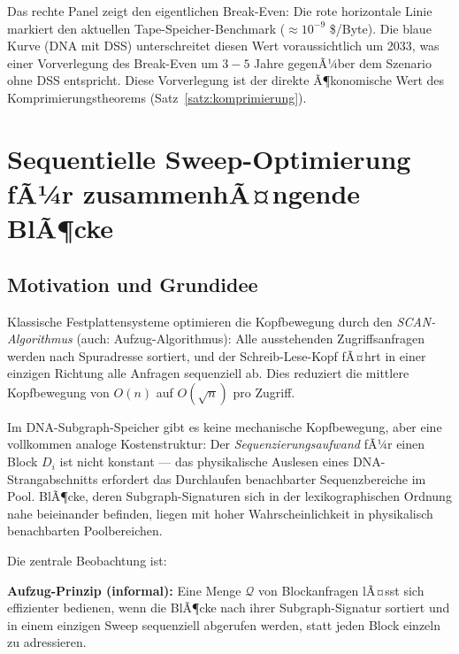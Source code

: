 ﻿\documentclass[a4paper,12pt]{article}
\theoremstyle{definition}
\theoremstyle{plain}
\begin{document}
Das rechte Panel zeigt den eigentlichen Break-Even: Die rote horizontale
Linie markiert den aktuellen Tape-Speicher-Benchmark ($\approx 10^{-9}$ \$/Byte).
Die blaue Kurve (DNA mit DSS) unterschreitet diesen Wert voraussichtlich
um 2033, was einer Vorverlegung des Break-Even um $3{-}5$ Jahre gegenÃ¼ber
dem Szenario ohne DSS entspricht.  Diese Vorverlegung ist der direkte
Ã¶konomische Wert des Komprimierungstheorems (Satz~\ref{satz:komprimierung}).

\section{Sequentielle Sweep-Optimierung fÃ¼r zusammenhÃ¤ngende BlÃ¶cke}
\label{sec:elevator}

\subsection{Motivation und Grundidee}
\label{ssec:elevator_motivation}

Klassische Festplattensysteme optimieren die Kopfbewegung durch den
\emph{SCAN-Algorithmus} (auch: Aufzug-Algorithmus): Alle ausstehenden
Zugriffsanfragen werden nach Spuradresse sortiert, und der
Schreib-Lese-Kopf fÃ¤hrt in einer einzigen Richtung alle Anfragen
sequenziell ab.  Dies reduziert die mittlere Kopfbewegung von $O(n)$
auf $O(\sqrt{n})$ pro Zugriff.

Im DNA-Subgraph-Speicher gibt es keine mechanische Kopfbewegung,
aber eine vollkommen analoge Kostenstruktur: Der \emph{Sequenzierungsaufwand}
fÃ¼r einen Block $D_i$ ist nicht konstant --- das physikalische Auslesen
eines DNA-Strangabschnitts erfordert das Durchlaufen benachbarter
Sequenzbereiche im Pool.  BlÃ¶cke, deren Subgraph-Signaturen sich in der
lexikographischen Ordnung nahe beieinander befinden, liegen mit hoher
Wahrscheinlichkeit in physikalisch benachbarten Poolbereichen.

Die zentrale Beobachtung ist:

\begin{mdframed}
  \textbf{Aufzug-Prinzip (informal):} Eine Menge $\mathcal{Q}$ von
  Blockanfragen lÃ¤sst sich effizienter bedienen, wenn die BlÃ¶cke nach
  ihrer Subgraph-Signatur sortiert und in einem einzigen Sweep sequenziell
  abgerufen werden, statt jeden Block einzeln zu adressieren.
\end{mdframed}
\end{document}
